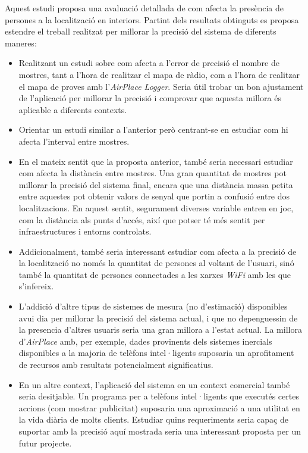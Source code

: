 
Aquest estudi proposa una avaluació detallada de com afecta la presència de persones a la localització en interiors. Partint dels resultats obtinguts es proposa estendre el treball realitzat per millorar la precisió del sistema de diferents maneres:

\begin{itemize}
    \item Realitzant un estudi sobre com afecta a l'error de precisió el nombre de mostres, tant a l'hora de realitzar el mapa de ràdio, com a l'hora de realitzar el mapa de proves amb l'\textit{AirPlace Logger}. Seria útil trobar un bon ajustament de l'aplicació per millorar la precisió i comprovar que aquesta millora és aplicable a diferents contexts.
    \item Orientar un estudi similar a l'anterior però centrant-se en estudiar com hi afecta l'interval entre mostres.
    \item En el mateix sentit que la proposta anterior, també seria necessari estudiar com afecta la distància entre mostres. Una gran quantitat de mostres pot millorar la precisió del sistema final, encara que una distància massa petita entre aquestes pot obtenir valors de senyal que portin a confusió entre dos localitzacions. En aquest sentit, segurament diverses variable entren en joc, com la distància als punts d'accés, així que potser té més sentit per infraestructures i entorns controlats.
    \item Addicionalment, també seria interessant estudiar com afecta a la precisió de la localització no només la quantitat de persones al voltant de l'usuari, sinó també la quantitat de persones connectades a les xarxes \textit{WiFi} amb les que s'infereix.
    \item L'addició d'altre tipus de sistemes de mesura (no d'estimació) disponibles avui dia per millorar la precisió del sistema actual, i que no depenguessin de la presencia d'altres usuaris seria una gran millora a l'estat actual. La millora d'\textit{AirPlace} amb, per exemple, dades provinents dels sistemes inercials disponibles a la majoria de telèfons intel·ligents suposaria un aprofitament de recursos amb resultats potencialment significatius.
    \item En un altre context, l'aplicació del sistema en un context comercial també seria desitjable. Un programa per a telèfons intel·ligents que executés certes accions (com mostrar publicitat) suposaria una aproximació a una utilitat en la vida diària de molts clients. Estudiar quins requeriments seria capaç de suportar amb la precisió aquí mostrada seria una interessant proposta per un futur projecte.
\end{itemize}
